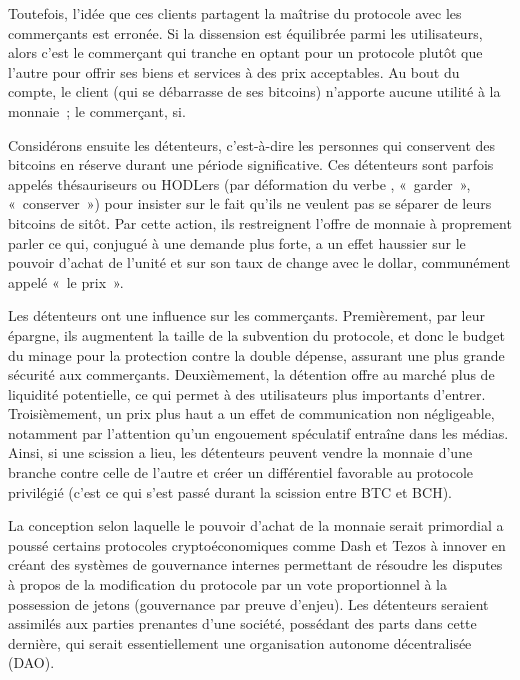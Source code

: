 Toutefois, l'idée que ces clients partagent la maîtrise du protocole avec les commerçants est erronée. Si la dissension est équilibrée parmi les utilisateurs, alors c'est le commerçant qui tranche en optant pour un protocole plutôt que l'autre pour offrir ses biens et services à des prix acceptables. Au bout du compte, le client (qui se débarrasse de ses bitcoins) n'apporte aucune utilité à la monnaie~; le commerçant, si.


Considérons ensuite les détenteurs, c'est-à-dire les personnes qui conservent des bitcoins en réserve durant une période significative. Ces détenteurs sont parfois appelés thésauriseurs ou HODLers (par déformation du verbe , «~garder~», «~conserver~») pour insister sur le fait qu'ils ne veulent pas se séparer de leurs bitcoins de sitôt. Par cette action, ils restreignent l'offre de monnaie à proprement parler ce qui, conjugué à une demande plus forte, a un effet haussier sur le pouvoir d'achat de l'unité et sur son taux de change avec le dollar, communément appelé «~le prix~».

Les détenteurs ont une influence sur les commerçants. Premièrement, par leur épargne, ils augmentent la taille de la subvention du protocole, et donc le budget du minage pour la protection contre la double dépense, assurant une plus grande sécurité aux commerçants. Deuxièmement, la détention offre au marché plus de liquidité potentielle, ce qui permet à des utilisateurs plus importants d'entrer. Troisièmement, un prix plus haut a un effet de communication non négligeable, notamment par l'attention qu'un engouement spéculatif entraîne dans les médias. Ainsi, si une scission a lieu, les détenteurs peuvent vendre la monnaie d'une branche contre celle de l'autre et créer un différentiel favorable au protocole privilégié (c'est ce qui s'est passé durant la scission entre BTC et BCH).

La conception selon laquelle le pouvoir d'achat de la monnaie serait primordial a poussé certains protocoles cryptoéconomiques comme Dash et Tezos à innover en créant des systèmes de gouvernance internes permettant de résoudre les disputes à propos de la modification du protocole par un vote proportionnel à la possession de jetons (gouvernance par preuve d'enjeu). Les détenteurs seraient assimilés aux parties prenantes d'une société, possédant des parts dans cette dernière, qui serait essentiellement une organisation autonome décentralisée (DAO).


